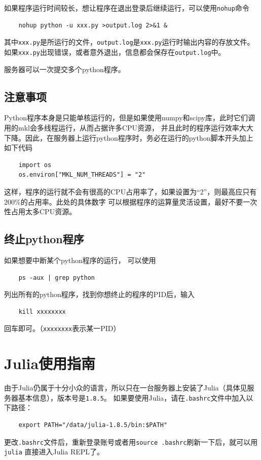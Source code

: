 \documentclass{article}
\begin{document}
如果程序运行时间较长，想让程序在退出登录后继续运行，可以使用\verb|nohup|命令
\begin{verbatim}
    nohup python -u xxx.py >output.log 2>&1 &
\end{verbatim}
其中\verb|xxx.py|是所运行的文件，\verb|output.log|是\verb|xxx.py|运行时输出内容的存放文件。
如果\verb|xxx.py|出现错误，或者意外退出，信息都会保存在\verb|output.log|中。

服务器可以一次提交多个python程序。

\subsection{注意事项}
Python程序本身是只能单核运行的，但是如果使用numpy和scipy库，此时它们调用的mkl会多线程运行，从而占据许多CPU资源，
并且此时的程序运行效率大大下降。因此，在服务器上运行python程序时，务必在运行的python脚本开头加上如下代码
\begin{verbatim}
    import os
    os.environ["MKL_NUM_THREADS"] = "2"
\end{verbatim}
这样，程序的运行就不会有很高的CPU占用率了，如果设置为``2''，则最高应只有$200\%$的占用率。此处的具体数字
可以根据程序的运算量灵活设置，最好不要一次性占用太多CPU资源。

\subsection{终止python程序}
如果想要中断某个python程序的运行，
可以使用
\begin{verbatim}
    ps -aux | grep python
\end{verbatim}
列出所有的python程序，找到你想终止的程序的PID后，输入
\begin{verbatim}
    kill xxxxxxxx
\end{verbatim}
回车即可。（\verb|xxxxxxxx|表示某一PID）

\section{Julia使用指南}
由于Julia仍属于十分小众的语言，所以只在一台服务器上安装了Julia（具体见服务器基本信息），版本号是\verb|1.8.5|。
如果要使用Julia，请在\verb|.bashrc|文件中加入以下路径：
\begin{verbatim}
    export PATH="/data/julia-1.8.5/bin:$PATH"
\end{verbatim}
更改\verb|.bashrc|文件后，重新登录账号或者用\verb|source .bashrc|刷新一下后，就可以用\verb|julia|
直接进入Julia REPL了。
\end{document}
